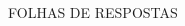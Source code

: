 \documentclass[a4paper,8pt]{exam}
\begin{document}
 




\small 

\begin{questions}

\begin{multicols}{2}

\end{multicols}


%

\end{questions}

\newpage
\begin{center}
  FOLHAS DE RESPOSTAS\\
\hfill \break




%   

\end{center}
\end{document}
